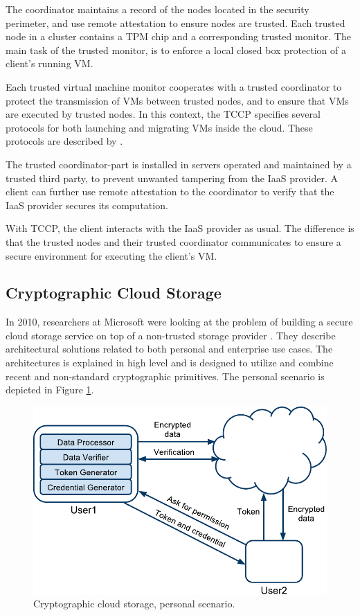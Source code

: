 \documentclass[pdftex,english,10pt,b5paper,twoside]{book}
\begin{document}
The coordinator maintains a record of the nodes located in the security
perimeter, and use remote attestation to ensure nodes are trusted. Each trusted
node in a cluster contains a \ac{TPM} chip and a corresponding trusted monitor.
The main task of the trusted monitor, is to enforce a local closed box
protection of a client's running \ac{VM}.

Each trusted virtual machine monitor cooperates with a trusted coordinator to
protect the transmission of \acp{VM} between trusted nodes, and to ensure that
\acp{VM} are executed by trusted nodes. In this context, the \ac{TCCP}
specifies several protocols for both launching and migrating \acp{VM} inside
the cloud. These protocols are described by \citet{tccp}.

The trusted coordinator-part is installed in servers operated and maintained by a
trusted third party, to prevent unwanted tampering from the \ac{IaaS} provider.
A client can further use remote attestation to the coordinator to verify that the
\ac{IaaS} provider secures its computation.

With \ac{TCCP}, the client interacts with the \ac{IaaS} provider as usual. The
difference is that the trusted nodes and their trusted coordinator communicates
to ensure a secure environment for executing the client's \ac{VM}.

\subsection{Cryptographic Cloud Storage}

In 2010, researchers at Microsoft were looking at the problem of building a
secure cloud storage service on top of a non-trusted storage provider
\cite{microsoftresearch}. They describe architectural solutions related to both
personal and enterprise use cases. The architectures is explained in high level
and is designed to utilize and combine recent and non-standard cryptographic
primitives. The personal scenario is depicted in Figure \ref{fig:RW:CCS:CA}.  

\begin{figure}[h!] 
    \centering
    \includegraphics[scale=0.6]{ArchitectureCCSC.pdf} 
    \caption{Cryptographic cloud storage, personal scenario.} 
    \label{fig:RW:CCS:CA} 
\end{figure}
\end{document}
